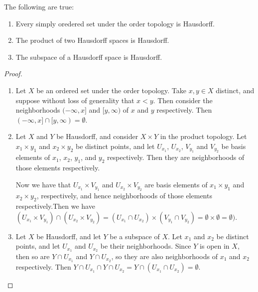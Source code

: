 \begin{theorem}\label{1.6.12}
    The following are true:
        \begin{enumerate}[label=(\arabic*)]
            \item Every simply oredered set under the order topology is
                Hausdorff.

            \item The product of two Hausdorff spaces is Hausdorff.

            \item The subspace of a Hausdorff space is Hausdorff.
        \end{enumerate}
\end{theorem}
\begin{proof}
    \begin{enumerate}[label=(\arabic*)]
        \item Let $X$ be an ordered set under the order topology. Take  $x,y \in
            X$ distinct, and suppose without loss of generality that $x<y$. Then
            consider the neighborhoods  $(-\infty,x]$ and  $[y,\infty)$ of  $x$
            and  $y$ respectively. Then  $(-\infty,x] \cap
            [y,\infty)=\emptyset$.

        \item Let $X$ and  $Y$ be Hausdorff, and consider  $X \times Y$ in the
            product topology. Let  $ x_1 \times y_1$ and $ x_2 \times y_2$ be
            distinct points, and let $U_{x_1}$, $U_{x_2}$, $V_{y_1}$ and
            $V_{y_2}$ be basis elements of $ x_1$, $ x_2$, $y_1$, and $y_2$
            respectively. Then they are neighborhoods of those elements
            respectively.

            Now we have that $U_{x_1} \times V_{y_1}$ and $U_{x_2} \times
            V_{y_2}$ are basis elements of $ x_1 \times y_1$ and $ x_2 \times
            y_2$, respectively, and hence neighborhoods of those elements
            respectively.Then we have $(U_{x_1} \times V_{y_1}) \cap (U_{x_2} \times
            V_{y_2})=(U_{x_1} \cap U_{x_2}) \times (V_{y_1} \cap V_{y_2}) = \emptyset
            \times \emptyset =\emptyset)$.

        \item Let $X$ be Hausdorff, and let  $Y$ be a subspace of  $X$. Let  $x_1$ 
            and $x_2$ be distinct points, and let  $U_{x_1}$ and $U_{x_2}$ be
            their neighborhoods. Since $Y$ is open in  $X$, then so are  $Y \cap
            U_{x_1}$ and $Y \cap U_{x_2}$, so they are also neighborhoods of $
            x_1$ and $ x_2$ respectively. Then $Y \cap
            U_{x_1} \cap Y \cap U_{x_2}=Y \cap (U_{x_1} \cap
            U_{x_2})=\emptyset$.
    \end{enumerate}		
\end{proof}
